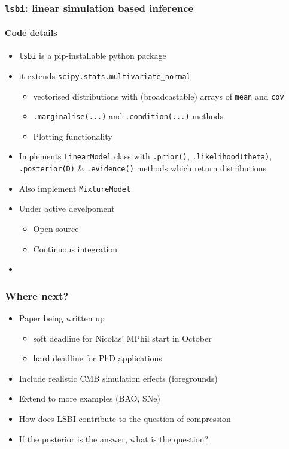 \documentclass[aspectratio=169]{beamer}
\begin{document}
\begin{frame}
    \frametitle{\texttt{lsbi}: linear simulation based inference}
    \framesubtitle{Code details}
    \begin{itemize}
        \item \texttt{lsbi} is a pip-installable python package
        \item it extends \texttt{scipy.stats.multivariate\_normal}
            \begin{itemize}
                \item vectorised distributions with (broadcastable) arrays of \texttt{mean} and \texttt{cov}
                \item \texttt{.marginalise(...)} and \texttt{.condition(...)} methods
                \item Plotting functionality
            \end{itemize}
        \item Implements \texttt{LinearModel} class with \texttt{.prior()}, \texttt{.likelihood(theta)}, \texttt{.posterior(D)} \& \texttt{.evidence()} methods which return distributions
        \item Also implement \texttt{MixtureModel}
        \item Under active develpoment
            \begin{itemize}
                \item Open source
                \item Continuous integration
            \end{itemize}
        \item {}
    \end{itemize}

\end{frame}

\begin{frame}
    \frametitle{Where next?}
    \begin{itemize}
        \item Paper being written up 
            \begin{itemize}
                \item soft deadline for Nicolas' MPhil start in October
                \item hard deadline for PhD applications
            \end{itemize}
        \item Include realistic CMB simulation effects (foregrounds)
        \item Extend to more examples (BAO, SNe)
        \item How does LSBI contribute to the question of compression
        \item If the posterior is the answer, what is the question?
    \end{itemize}
\end{frame}
\end{document}

